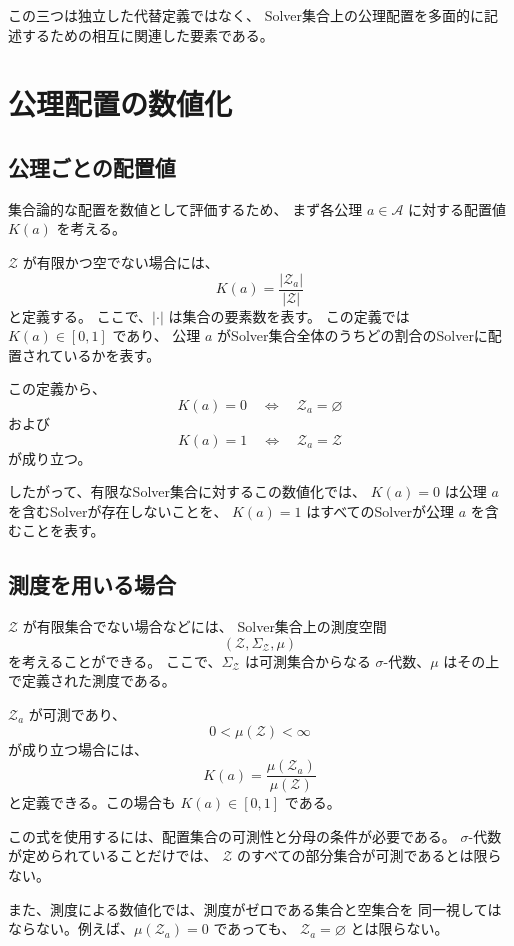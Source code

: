 \documentclass[a4paper,12pt]{article}
\begin{document}
この三つは独立した代替定義ではなく、
Solver集合上の公理配置を多面的に記述するための相互に関連した要素である。

\section{公理配置の数値化}

\subsection{公理ごとの配置値}

集合論的な配置を数値として評価するため、
まず各公理 $a\in\mathcal{A}$ に対する配置値 $K(a)$ を考える。

$\mathcal{Z}$ が有限かつ空でない場合には、
\[
    K(a)=\frac{|\mathcal{Z}_a|}{|\mathcal{Z}|}
\]
と定義する。
ここで、$|\cdot|$ は集合の要素数を表す。
この定義では $K(a)\in[0,1]$ であり、
公理 $a$ がSolver集合全体のうちどの割合のSolverに配置されているかを表す。

この定義から、
\[
    K(a)=0
    \quad\Longleftrightarrow\quad
    \mathcal{Z}_a=\varnothing
\]
および
\[
    K(a)=1
    \quad\Longleftrightarrow\quad
    \mathcal{Z}_a=\mathcal{Z}
\]
が成り立つ。

したがって、有限なSolver集合に対するこの数値化では、
$K(a)=0$ は公理 $a$ を含むSolverが存在しないことを、
$K(a)=1$ はすべてのSolverが公理 $a$ を含むことを表す。

\subsection{測度を用いる場合}

$\mathcal{Z}$ が有限集合でない場合などには、
Solver集合上の測度空間
\[
    (\mathcal{Z},\Sigma_{\mathcal{Z}},\mu)
\]
を考えることができる。
ここで、$\Sigma_{\mathcal{Z}}$ は可測集合からなる
$\sigma$-代数、$\mu$ はその上で定義された測度である。

$\mathcal{Z}_a$ が可測であり、
\[
    0<\mu(\mathcal{Z})<\infty
\]
が成り立つ場合には、
\[
    K(a)=\frac{\mu(\mathcal{Z}_a)}{\mu(\mathcal{Z})}
\]
と定義できる。この場合も $K(a)\in[0,1]$ である。

この式を使用するには、配置集合の可測性と分母の条件が必要である。
$\sigma$-代数が定められていることだけでは、
$\mathcal{Z}$ のすべての部分集合が可測であるとは限らない。

また、測度による数値化では、測度がゼロである集合と空集合を
同一視してはならない。例えば、$\mu(\mathcal{Z}_a)=0$ であっても、
$\mathcal{Z}_a=\varnothing$ とは限らない。
\end{document}

